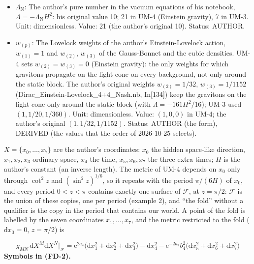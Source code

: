 \documentclass[
  10pt,
]{article}
\begin{document}
\begin{itemize}
  direction). The author writes the pure number \(\Lambda_{\mathrm{N}}\)
  in
  \(0 = -\Lambda_{\mathrm{N}} + \sum_p H^{-2p}w_{(p)}\mathcal{E}_{(p)}\),
  so that \(\Lambda = -\Lambda_{\mathrm{N}}H^2\). Unit: GeV\(^2\).
  Value: \(-21H^2\); the author's original \(-10H^2\); UM-3: \(-7H^2\).
  Status: AUTHOR (the term), DERIVED (the value).
\item
  \(\Lambda_{\mathrm{N}}\): The author's pure number in the vacuum
  equations of his notebook, \(\Lambda = -\Lambda_{\mathrm{N}}H^2\): his
  original value 10; 21 in UM-4 (Einstein gravity), 7 in UM-3. Unit:
  dimensionless. Value: 21 (the author's original 10). Status: AUTHOR.
\item
  \(w_{(p)}\): The Lovelock weights of the author's Einstein-Lovelock
  action, \(w_{(1)} = 1\) and \(w_{(2)}\), \(w_{(3)}\) of the
  Gauss-Bonnet and the cubic densities. UM-4 sets
  \(w_{(2)} = w_{(3)} = 0\) (Einstein gravity): the only weights for
  which gravitons propagate on the light cone on every background, not
  only around the static block. The author's original weights
  \(w_{(2)} = 1/32\), \(w_{(3)} = 1/1152\)
  (Dirac\_Einstein-Lovelock\_4+4\_Nash.nb, In{[}134{]}) keep the
  gravitons on the light cone only around the static block (with
  \(\Lambda = -161H^2/16\)); UM-3 used \((1, 1/20, 1/360)\). Unit:
  dimensionless. Value: \((1, 0, 0)\) in UM-4; the author's original
  \((1, 1/32, 1/1152)\). Status: AUTHOR (the form), DERIVED (the values
  that the order of 2026-10-25 selects).
\end{itemize}

\(X = \{x_0, \dots, x_7\}\) are the author's coordinates: \(x_0\) the
hidden space-like direction, \(x_1, x_2, x_3\) ordinary space, \(x_4\)
the time, \(x_5, x_6, x_7\) the three extra times; \(H\) is the author's
constant (an inverse length). The metric of UM-4 depends on \(x_0\) only
through \(\cot^2z\) and \((\sin^2z)^{1/6}\), so it repeats with the
period \(\pi/(6H)\) of \(x_0\), and every period \(0 < z < \pi\)
contains exactly one surface of \(\mathcal{F}\), at \(z = \pi/2\):
\(\mathcal{F}\) is the union of these copies, one per period (example
2), and ``the fold'' without a qualifier is the copy in the period that
contains our world. A point of the fold is labelled by the seven
coordinates \(x_1, \dots, x_7\), and the metric restricted to the fold
(\(\mathrm{d}x_0 = 0\), \(z = \pi/2\)) is

\[
g_{MN}\,\mathrm{d}X^M\mathrm{d}X^N\big\vert_{\mathcal{F}} = \mathrm{e}^{2a_4}\big(\mathrm{d}x_1^2 + \mathrm{d}x_2^2 + \mathrm{d}x_3^2\big)
 - \mathrm{d}x_4^2 - \mathrm{e}^{-2a_4}b_4^2\big(\mathrm{d}x_5^2 + \mathrm{d}x_6^2 + \mathrm{d}x_7^2\big) \tag{FD-2}
\] \textbf{Symbols in (FD-2).}
\end{document}
